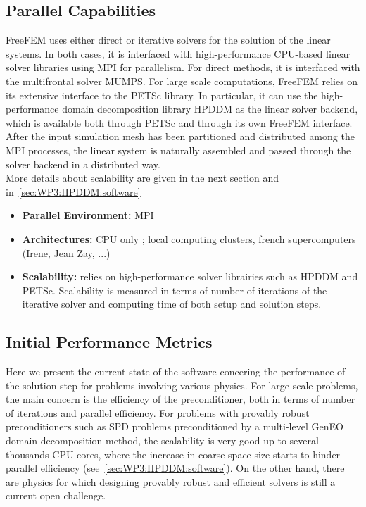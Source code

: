 \subsection{Parallel Capabilities}
\label{sec:WP3:Freefem++:performances}

FreeFEM uses either direct or iterative solvers for the solution of the linear systems. In both cases, it is interfaced with high-performance CPU-based linear solver libraries using MPI for parallelism. For direct methods, it is interfaced with the multifrontal solver MUMPS. For large scale computations, FreeFEM relies on its extensive interface to the PETSc library. In particular, it can use the high-performance domain decomposition library HPDDM as the linear solver backend, which is available both through PETSc and through its own FreeFEM interface. After the input simulation mesh has been partitioned and distributed among the MPI processes, the linear system is naturally assembled and passed through the solver backend in a distributed way.\\
More details about scalability are given in the next section and in~\cref{sec:WP3:HPDDM:software}

\begin{itemize}
    \item \textbf{Parallel Environment:} MPI

    \item \textbf{Architectures:} CPU only ; local computing clusters, french supercomputers (Irene, Jean Zay, ...)

    \item \textbf{Scalability:} relies on high-performance solver librairies such as HPDDM and PETSc. Scalability is measured in terms of number of iterations of the iterative solver and computing time of both setup and solution steps.
\end{itemize}

\subsection{Initial Performance Metrics}
\label{sec:WP3:Freefem++:metrics}

Here we present the current state of the software concering the performance of the solution step for problems involving various physics. For large scale problems, the main concern is the efficiency of the preconditioner, both in terms of number of iterations and parallel efficiency. For problems with provably robust preconditioners such as SPD problems preconditioned by a multi-level GenEO domain-decomposition method, the scalability is very good up to several thousands CPU cores, where the increase in coarse space size starts to hinder parallel efficiency (see~\cref{sec:WP3:HPDDM:software}). On the other hand, there are physics for which designing provably robust and efficient solvers is still a current open challenge.\\

